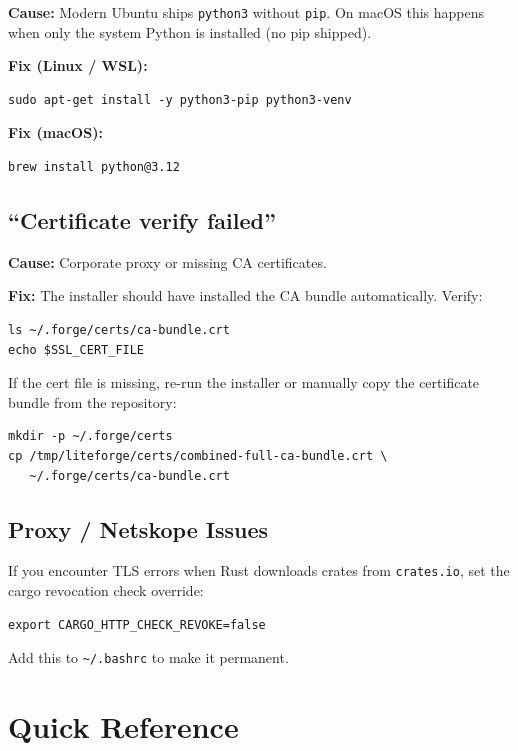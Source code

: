\documentclass[11pt,letterpaper]{article}
\begin{document}
\textbf{Cause:} Modern Ubuntu ships \texttt{python3} without \texttt{pip}.
On macOS this happens when only the system Python is installed (no pip
shipped).

\textbf{Fix (Linux / WSL):}
\begin{lstlisting}[style=bash]
sudo apt-get install -y python3-pip python3-venv
\end{lstlisting}

\textbf{Fix (macOS):}
\begin{lstlisting}[style=bash]
brew install python@3.12
\end{lstlisting}

\subsection{``Certificate verify failed''}

\textbf{Cause:} Corporate proxy or missing CA certificates.

\textbf{Fix:} The installer should have installed the CA bundle
automatically. Verify:
\begin{lstlisting}[style=bash]
ls ~/.forge/certs/ca-bundle.crt
echo $SSL_CERT_FILE
\end{lstlisting}

If the cert file is missing, re-run the installer or manually copy the
certificate bundle from the repository:
\begin{lstlisting}[style=bash]
mkdir -p ~/.forge/certs
cp /tmp/liteforge/certs/combined-full-ca-bundle.crt \
   ~/.forge/certs/ca-bundle.crt
\end{lstlisting}

\subsection{Proxy / Netskope Issues}

If you encounter TLS errors when Rust downloads crates from
\texttt{crates.io}, set the cargo revocation check override:

\begin{lstlisting}[style=bash]
export CARGO_HTTP_CHECK_REVOKE=false
\end{lstlisting}

Add this to \texttt{\textasciitilde/.bashrc} to make it permanent.

\newpage
\section{Quick Reference}
\end{document}
